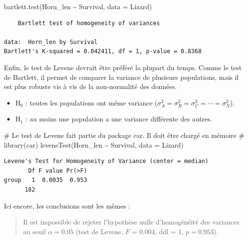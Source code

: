 \documentclass[
  a4paper,
]{article}
\newenvironment{Shaded}{\begin{snugshade}}{\end{snugshade}}
\newcommand{\AttributeTok}[1]{\textcolor[rgb]{0.00,0.34,0.68}{#1}}
\newcommand{\CommentTok}[1]{\textcolor[rgb]{0.54,0.53,0.53}{#1}}
\newcommand{\FunctionTok}[1]{\textcolor[rgb]{0.39,0.29,0.61}{#1}}
\newcommand{\NormalTok}[1]{\textcolor[rgb]{0.12,0.11,0.11}{#1}}
\newcommand{\SpecialCharTok}[1]{\textcolor[rgb]{0.24,0.68,0.91}{#1}}
\providecommand{\tightlist}{%
  \setlength{\itemsep}{0pt}\setlength{\parskip}{0pt}}
\begin{document}
\begin{Shaded}
\begin{Highlighting}[]
\FunctionTok{bartlett.test}\NormalTok{(Horn\_len }\SpecialCharTok{\textasciitilde{}}\NormalTok{ Survival, }\AttributeTok{data =}\NormalTok{ Lizard)}
\end{Highlighting}
\end{Shaded}

\begin{verbatim}
    Bartlett test of homogeneity of variances

data:  Horn_len by Survival
Bartlett's K-squared = 0.042411, df = 1, p-value = 0.8368
\end{verbatim}

Enfin, le test de Levene devrait être préféré la plupart du temps. Comme le test de Bartlett, il permet de comparer la variance de plusieurs populations, mais il est plus robuste vis à vis de la non-normalité des données.

\begin{itemize}
\tightlist
\item
  H\(_0\) : toutes les populations ont même variance (\(\sigma^2_A = \sigma^2_B = \sigma^2_C = \cdots = \sigma^2_N\)).
\item
  H\(_1\) : au moins une population a une variance différente des autres.
\end{itemize}

\begin{Shaded}
\begin{Highlighting}[]
\CommentTok{\# Le test de Levene fait partie du package car. Il doit être chargé en mémoire}
\CommentTok{\# library(car)}
\FunctionTok{leveneTest}\NormalTok{(Horn\_len }\SpecialCharTok{\textasciitilde{}}\NormalTok{ Survival, }\AttributeTok{data =}\NormalTok{ Lizard)}
\end{Highlighting}
\end{Shaded}

\begin{verbatim}
Levene's Test for Homogeneity of Variance (center = median)
       Df F value Pr(>F)
group   1  0.0035  0.953
      182               
\end{verbatim}

Ici encore, les conclusions sont les mêmes :

\begin{quote}
Il est impossible de rejeter l'hypothèse nulle d'homogénéité des variances au seuil \(\alpha = 0.05\) (test de Levene, \(F\) = 0.004, ddl = 1, \(p = 0.953\)).
\end{quote}
\end{document}

